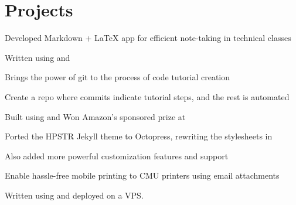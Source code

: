 \documentclass[]{deedy-resume-openfont}
\begin{document}
\begin{minipage}[t]{0.66\textwidth}
\section{Projects}
\descript{}
\begin{tightemize}
\item Developed Markdown + \LaTeX{} app for efficient note-taking in technical classes
\item Written using  and 
\end{tightemize}
\sectionsep

\descript{}
\begin{tightemize}
\item Brings the power of git to the process of code tutorial creation
\item Create a repo where commits indicate tutorial steps, and the rest is automated
\item Built using  and  Won Amazon's sponsored prize at 
\end{tightemize}
\sectionsep

\descript{}
\begin{tightemize}
\item Ported the HPSTR Jekyll theme to Octopress, rewriting the stylesheets in 
\item Also added more powerful customization features and  support
\end{tightemize}
\sectionsep

\descript{}
\begin{tightemize}
\item Enable hassle-free mobile printing to CMU printers using email attachments
\item Written using  and  deployed on a  VPS.
\end{tightemize}
\sectionsep





\end{minipage}
\end{document}
